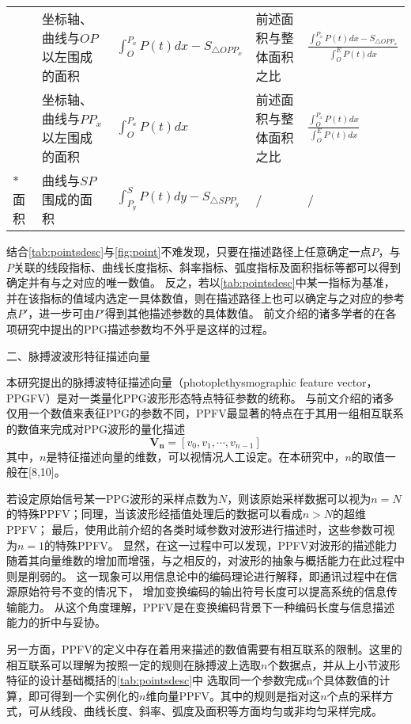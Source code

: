 \begin{center}
\begin{longtable}{m{1.57cm}<{\centering}m{4.07cm}<{\centering}m{2.07cm}<{\centering}m{4.07cm}<{\centering}m{2.67cm}<{\centering}}
                                     &   坐标轴、曲线与$OP$以左围成的面积   &    $\int_{O}^{P_x}{P(t)dx}-S_{\triangle OPP_x}$   &  前述面积与整体面积之比     & $\frac{\int_{O}^{P_x}{P(t)dx}-S_{\triangle OPP_x}}{\int_O^E{P(t)dx}}$ \\
                                     &   坐标轴、曲线与$PP_x$以左围成的面积   &   $\int_{O}^{P_x}{P(t)dx}$    &  前述面积与整体面积之比     & $\frac{\int_{O}^{P_x}{P(t)dx}}{\int_O^E{P(t)dx}}$ \\
         \multirow{-4}*{面积}        &    曲线与$SP$围成的面积   &   $\int_{P_y}^{S}{P(t)dy}-S_{\triangle SPP_y} $    &   /    &  /\\
	\end{longtable}
\end{center}

结合\autoref{tab:pointsdesc}与\autoref{fig:point}不难发现，只要在描述路径上任意确定一点$P$，与$P$关联的线段指标、曲线长度指标、斜率指标、弧度指标及面积指标等都可以得到确定并有与之对应的唯一数值。
反之，若以\autoref{tab:pointsdesc}中某一指标为基准，并在该指标的值域内选定一具体数值，则在描述路径上也可以确定与之对应的参考点$P'$，进一步可由$P'$得到其他描述参数的具体数值。
前文介绍的诸多学者的在各项研究中提出的PPG描述参数均不外乎是这样的过程。

二、脉搏波波形特征描述向量

本研究提出的脉搏波特征描述向量（photoplethysmographic feature vector，PPGFV）是对一类量化PPG波形形态特点特征参数的统称。
与前文介绍的诸多仅用一个数值来表征PPG的参数不同，PPFV最显著的特点在于其用一组相互联系的数值来完成对PPG波形的量化描述
\begin{equation}
    \label{equ:featurevector}
    \boldsymbol {V_n}=[v_0,v_1,\cdots,v_{n-1}]
\end{equation}
其中，$n$是特征描述向量的维数，可以视情况人工设定。在本研究中，$n$的取值一般在[8,10]。

若设定原始信号某一PPG波形的采样点数为$N$，则该原始采样数据可以视为$n=N$的特殊PPFV；同理，当该波形经插值处理后的数据可以看成$n>N$的超维PPFV；
最后，使用此前介绍的各类时域参数对波形进行描述时，这些参数可视为$n=1$的特殊PPFV。
显然，在这一过程中可以发现，PPFV对波形的描述能力随着其向量维数的增加而增强，与之相反的，对波形的抽象与概括能力在此过程中则是削弱的。
这一现象可以用信息论中的编码理论进行解释，即通讯过程中在信源原始符号不变的情况下，
增加变换编码的输出符号长度可以提高系统的信息传输能力\cite{Zhao2017}。
从这个角度理解，PPFV是在变换编码背景下一种编码长度与信息描述能力的折中与妥协。

另一方面，PPFV的定义中存在着用来描述的数值需要有相互联系的限制。这里的相互联系可以理解为按照一定的规则在脉搏波上选取$n$个数据点，并从上小节波形特征的设计基础概括的\autoref{tab:pointsdesc}中
选取同一个参数完成n个具体数值的计算，即可得到一个实例化的$n$维向量PPFV。其中的规则是指对这$n$个点的采样方式，可从线段、曲线长度、斜率、弧度及面积等方面均匀或非均匀采样完成。

